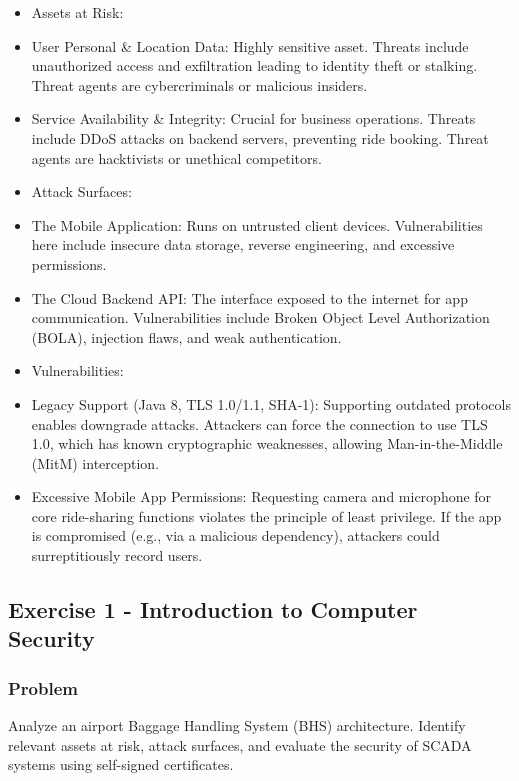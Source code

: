 \documentclass{article}
\begin{document}
\begin{itemize}
    \item[\textbf{1.}] Assets at Risk:
    \item User Personal \& Location Data: Highly sensitive asset. Threats include unauthorized access and exfiltration leading to identity theft or stalking. Threat agents are cybercriminals or malicious insiders.
    \item Service Availability \& Integrity: Crucial for business operations. Threats include DDoS attacks on backend servers, preventing ride booking. Threat agents are hacktivists or unethical competitors.

    \item[\textbf{2.}] Attack Surfaces:
    \item The Mobile Application: Runs on untrusted client devices. Vulnerabilities here include insecure data storage, reverse engineering, and excessive permissions.
    \item The Cloud Backend API: The interface exposed to the internet for app communication. Vulnerabilities include Broken Object Level Authorization (BOLA), injection flaws, and weak authentication.

    \item[\textbf{3.}] Vulnerabilities:
    \item Legacy Support (Java 8, TLS 1.0/1.1, SHA-1): Supporting outdated protocols enables downgrade attacks. Attackers can force the connection to use TLS 1.0, which has known cryptographic weaknesses, allowing Man-in-the-Middle (MitM) interception.
    \item Excessive Mobile App Permissions: Requesting camera and microphone for core ride-sharing functions violates the principle of least privilege. If the app is compromised (e.g., via a malicious dependency), attackers could surreptitiously record users.
\end{itemize}

\subsection{Exercise 1 - Introduction to Computer Security}
\subsubsection*{Problem}
Analyze an airport Baggage Handling System (BHS) architecture. Identify relevant assets at risk, attack surfaces, and evaluate the security of SCADA systems using self-signed certificates.
\end{document}
